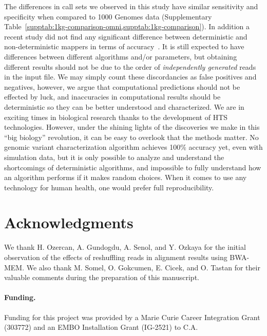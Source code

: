 \documentclass{bioinfo}
\begin{document}
The differences in call sets we observed in this study 
have similar sensitivity and specificity when compared to 1000 Genomes data (Supplementary Table~\ref{supptab:1kg-comparison-omni,supptab:1kg-comparison}). In addition a recent study did not find any significant difference between deterministic and non-deterministic mappers in terms of accuracy~\citep{Cornish2015}.
It is still expected to 
have differences between different algorithms and/or parameters, but
obtaining different results should not be due to the order of {\it independently generated} reads in the input file. 
We may simply count these discordancies as false positives and negatives, however, 
we argue that computational predictions should not be effected by luck, and inaccuracies in computational results should be deterministic so they can be better understood and characterized.
We are in exciting times in biological research thanks to the development of HTS technologies. However, under the shining lights of the discoveries we make in this ``big biology'' revolution,  
it can be easy to overlook that the methods matter.
No genomic variant characterization algorithm achieves 100\% accuracy yet, even with  simulation data, but it is only possible to analyze and understand the shortcomings of 
deterministic algorithms, and impossible to fully understand how an algorithm performs if it makes random choices. 
When it comes to use any technology for human health, one would prefer full reproducibility. 

\vspace*{-0.75cm}

\section*{Acknowledgments}

We thank H. Ozercan, A. Gundogdu, A. Senol, and Y. Ozkaya for the initial observation of the effects of reshuffling reads in alignment results using BWA-MEM. We also thank M. Somel, 
O. Gokcumen, E. Cicek, and O. Tastan for
their valuable comments during the preparation of this manuscript.

\paragraph{Funding.}
Funding for this project was provided by a Marie Curie Career Integration Grant (303772) and an 
EMBO Installation Grant (IG-2521) to C.A.

\vspace*{-0.75cm}

\footnotesize




\clearpage


\end{document}
